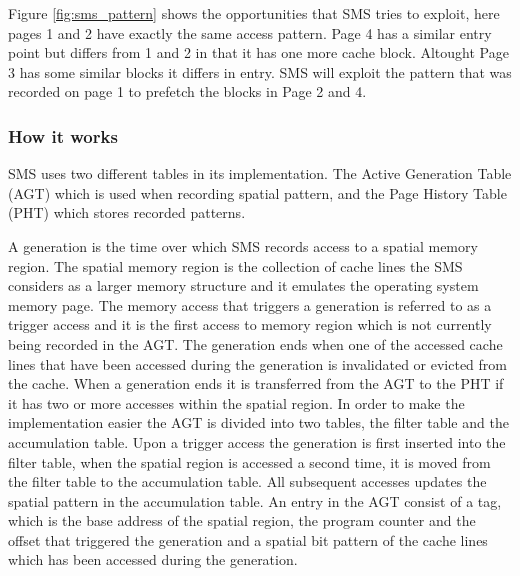 Figure \ref{fig:sms_pattern} shows the opportunities that SMS tries to exploit, here pages 1 and 2 have exactly the same access pattern. Page 4 has a similar entry point but differs from 1 and 2 in that it has one more cache block. Altought Page 3 has some similar blocks it differs in entry. SMS will exploit the pattern that was recorded on page 1 to prefetch the blocks in Page 2 and 4.

\subsubsection{How it works}
SMS uses two different tables in its implementation. The Active
Generation Table (AGT) which is used when recording spatial pattern,
and the Page History Table (PHT) which stores recorded patterns. 

A generation is the time over which SMS records access to a spatial
memory region. The spatial memory region is the collection of cache
lines the SMS considers as a larger memory structure and it emulates
the operating system memory page. The memory access that triggers a
generation is referred to as a trigger access and it is the first
access to memory region which is not currently being recorded in the
AGT. The generation ends when one of the accessed cache lines that
have been accessed during the generation is invalidated or evicted
from the cache.  When a generation ends it is transferred from the AGT
to the PHT if it has two or more accesses within the spatial
region. In order to make the implementation easier the AGT is divided
into two tables, the filter table and the accumulation table.  Upon a
trigger access the generation is first inserted into the filter table,
when the spatial region is accessed a second time, it is moved from
the filter table to the accumulation table. All subsequent accesses
updates the spatial pattern in the accumulation table.  An entry in
the AGT consist of a tag, which is the base address of the spatial
region, the program counter and the offset that triggered the
generation and a spatial bit pattern of the cache lines which has been
accessed during the generation. 

